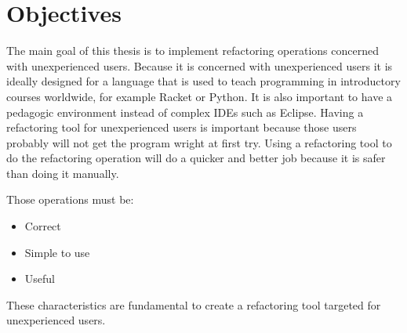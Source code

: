 
% 
% 

\section{Objectives}





The main goal of this thesis is to implement refactoring operations concerned with unexperienced users.
Because it is concerned with unexperienced users it is ideally designed for a language that is used to teach programming in introductory courses worldwide, for example Racket or Python.
It is also important to have a pedagogic environment instead of complex IDEs such as Eclipse.
Having a refactoring tool for unexperienced users is important because those users probably will not get the program wright at first try.
Using a refactoring tool to do the refactoring operation will do a quicker and better job because it is safer than doing it manually.

Those operations must be:
\begin{itemize}
\item Correct
\item Simple to use
\item Useful
\end{itemize}

These characteristics are fundamental to create a refactoring tool targeted for unexperienced users.